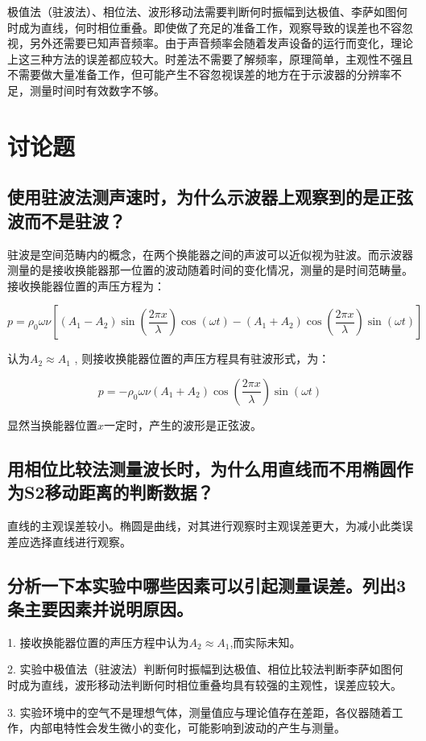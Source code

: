 \documentclass{ctexart}
\begin{document}
极值法（驻波法）、相位法、波形移动法需要判断何时振幅到达极值、李萨如图何时成为直线，何时相位重叠。即使做了充足的准备工作，观察导致的误差也不容忽视，另外还需要已知声音频率。由于声音频率会随着发声设备的运行而变化，理论上这三种方法的误差都应较大。时差法不需要了解频率，原理简单，主观性不强且不需要做大量准备工作，但可能产生不容忽视误差的地方在于示波器的分辨率不足，测量时间时有效数字不够。

\section{讨论题}

\subsection{使用驻波法测声速时，为什么示波器上观察到的是正弦波而不是驻波？}

驻波是空间范畴内的概念，在两个换能器之间的声波可以近似视为驻波。而示波器测量的是接收换能器那一位置的波动随着时间的变化情况，测量的是时间范畴量。接收换能器位置的声压方程为：

$$ p = \rho_0 \omega \nu \left[(A_1-A_2)\sin\left(\frac{2\pi x}{\lambda}\right)\cos(\omega t)-(A_1+A_2)\cos\left(\frac{2\pi x}{\lambda}\right)\sin(\omega t)\right]  $$

认为$ A_2 \approx A_1 $ , 则接收换能器位置的声压方程具有驻波形式，为：

$$  p = -\rho_0 \omega \nu (A_1+A_2)\cos\left(\frac{2\pi x}{\lambda}\right)\sin(\omega t) $$

显然当换能器位置$x$一定时，产生的波形是正弦波。

\subsection{用相位比较法测量波长时，为什么用直线而不用椭圆作为S2移动距离的判断数据？}

直线的主观误差较小。椭圆是曲线，对其进行观察时主观误差更大，为减小此类误差应选择直线进行观察。

\subsection{分析一下本实验中哪些因素可以引起测量误差。列出3条主要因素并说明原因。}

1. 接收换能器位置的声压方程中认为$ A_2 \approx A_1 $,而实际未知。

2. 实验中极值法（驻波法）判断何时振幅到达极值、相位比较法判断李萨如图何时成为直线，波形移动法判断何时相位重叠均具有较强的主观性，误差应较大。

3. 实验环境中的空气不是理想气体，测量值应与理论值存在差距，各仪器随着工作，内部电特性会发生微小的变化，可能影响到波动的产生与测量。
\end{document}
